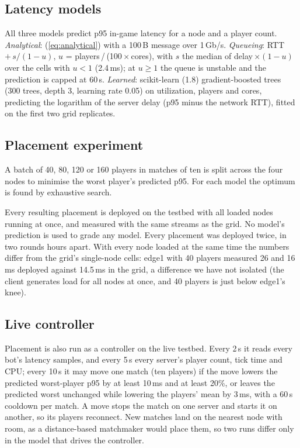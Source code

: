 \documentclass[conference]{IEEEtran}
\begin{document}
\subsection{Latency models}
All three models predict p95 in-game latency for a node and a player count.
\emph{Analytical}: (\ref{eq:analytical}) with a 100\,B message over 1\,Gb/s.
\emph{Queueing}: RTT\,$+\,s/(1-u)$, $u$ = players\,/\,(100\,$\times$\,cores),
with $s$ the median of delay\,$\times(1-u)$ over the cells with $u<1$ (2.4\,ms);
at $u \ge 1$ the queue is unstable and the prediction is capped at 60\,s.
\emph{Learned}: scikit-learn (1.8) gradient-boosted trees (300 trees, depth 3,
learning rate 0.05) on utilization, players and cores, predicting the
logarithm of the server delay (p95 minus the network RTT), fitted on the
first two grid replicates.

\subsection{Placement experiment}
A batch of 40, 80, 120 or 160 players in matches of ten is
split across the four nodes to minimise the worst player's predicted p95. For
each model the optimum is found by exhaustive search.

Every resulting placement is deployed on the testbed with
all loaded nodes running at once, and measured with the same streams as the
grid. No model's prediction is used to grade any model. Every placement was
deployed twice, in two rounds hours apart. With every node loaded at the same time the numbers differ
from the grid's single-node cells: edge1 with 40 players measured 26 and 16\,ms
deployed against 14.5\,ms in the grid, a difference we have not isolated
(the client generates load for all nodes at once, and 40 players is just
below edge1's knee).


\subsection{Live controller}
Placement is also run as a controller on the live testbed. Every 2\,s it reads every
bot's latency samples, and every 5\,s every server's player count, tick time
and CPU; every 10\,s it may move one match (ten players) if the move lowers
the predicted worst-player p95 by at least 10\,ms and at least 20\%, or
leaves the predicted worst unchanged while lowering the players' mean by 3\,ms, with a 60\,s cooldown per match. A move stops the match on one server and starts it on
another, so its players reconnect. New matches land on the nearest node with
room, as a distance-based matchmaker would place them, so two runs differ only
in the model that drives the controller.
\end{document}
